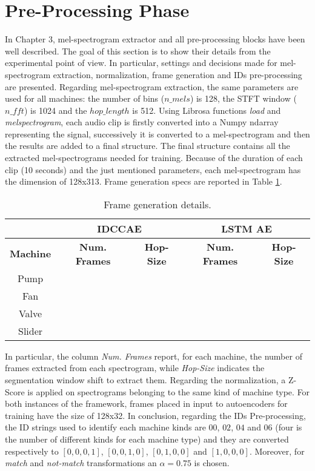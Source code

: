 \section{Pre-Processing Phase}
In Chapter 3, mel-spectrogram extractor and all pre-processing blocks have been well described. The goal of this section is to show their details from the experimental point of view. In particular, settings and decisions made for mel-spectrogram extraction, normalization, frame generation and IDs pre-processing are presented. Regarding mel-spectrogram extraction, the same parameters are used for all machines: the number of bins ($n\_mels$) is 128, the STFT window ($n\_fft$) is 1024 and the $hop\_length$ is 512. Using Librosa functions \textit{load} and \textit{melspectrogram}, each audio clip is firstly converted into a Numpy ndarray representing the signal, successively it is converted to a mel-spectrogram and then the results are added to a final structure. The final structure contains all the extracted mel-spectrograms needed for training. Because of the duration of each clip (10 seconds) and the just mentioned parameters, each mel-spectrogram has the dimension of 128x313. Frame generation specs are reported in Table \ref{frame-generation}.\\
\begin{table}[ht]
\centering
\begin{tabular}{|c|c|c|c|c|} 
\cline{2-5}
\multicolumn{1}{c|}{} & \multicolumn{2}{c|}{\textbf{IDCCAE}} & \multicolumn{2}{c|}{\textbf{LSTM AE}} \\ 
\hline
\textbf{Machine} & \textbf{Num. Frames} & \textbf{Hop-Size} & \textbf{Num. Frames} & \textbf{Hop-Size} \\ 
\hline
Pump &  &  &  &  \\ 
\hline
Fan &  &  &  &  \\ 
\hline
Valve &  &  &  &  \\ 
\hline
Slider &  &  &  &  \\
\hline
\end{tabular}
\caption{Frame generation details.}
\label{frame-generation}
\end{table}
In particular, the column \textit{Num. Frames} report, for each machine, the number of frames extracted from each spectrogram, while \textit{Hop-Size} indicates the segmentation window shift to extract them. Regarding the normalization, a Z-Score is applied on spectrograms belonging to the same kind of machine type. For both instances of the framework, frames placed in input to autoencoders for training have the size of 128x32. In conclusion, regarding the IDs Pre-processing, the ID strings used to identify each machine kinds are $00$, $02$, $04$ and $06$ (four is the number of different kinds for each machine type) and they are converted respectively to $[0,0,0,1]$, $[0,0,1,0]$, $[0,1,0,0]$ and $[1,0,0,0]$. Moreover, for \textit{match} and \textit{not-match} transformations an $\alpha=0.75$ is chosen.

